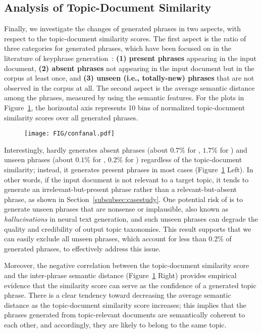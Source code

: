 \subsection{Analysis of Topic-Document Similarity}
\label{subsec:unseenphs}
Finally, we investigate the changes of generated phrases in two aspects, with respect to the topic-document similarity scores.
The first aspect is the ratio of three categories for generated phrases, which have been focused on in the literature of keyphrase generation~\cite{meng2017deep, zhou2021topic}: 
\textbf{(1) present phrases} appearing in the input document, 
\textbf{(2) absent phrases} not appearing in the input document but in the corpus at least once, 
and \textbf{(3) unseen (i.e., totally-new) phrases} that are not observed in the corpus at all.
The second aspect is the average semantic distance among the phrases, measured by using the semantic features. %
For the plots in Figure~\ref{fig:confanal}, the horizontal axis represents 10 bins of normalized topic-document similarity scores over all generated phrases.

\begin{figure}[t]
    \centering
    \texttt{[image: FIG/confanal.pdf]}
    \caption{}
    \label{fig:confanal}
\end{figure}

Interestingly, \proposed hardly generates absent phrases (about $0.7\%$ for \amazon, $1.7\%$ for \dbpedia) and unseen phrases (about $0.1\%$ for \amazon, $0.2\%$ for \dbpedia) regardless of the topic-document similarity; instead, it generates present phrases in most cases (Figure~\ref{fig:confanal} Left). 
In other words, if the input document is not relevant to a target topic, it tends to generate an irrelevant-but-present phrase rather than a relevant-but-absent phrase, as shown in Section~\ref{subsubsec:casestudy}. 
One potential risk of \proposed is to generate unseen phrases that are nonsense or implausible, also known as \textit{hallucinations} in neural text generation, and such unseen phrases can degrade the quality and credibility of output topic taxonomies. 
This result supports that we can easily exclude all unseen phrases, which account for less than 0.2\% of generated phrases, to effectively address this issue.

Moreover, the negative correlation between the topic-document similarity score and the inter-phrase semantic distance (Figure~\ref{fig:confanal} Right) provides empirical evidence that the similarity score can serve as the confidence of a generated topic phrase.
There is a clear tendency toward decreasing the average semantic distance as the topic-document similarity score increases;
this implies that the phrases generated from topic-relevant documents are semantically coherent to each other, and accordingly, they are likely to belong to the same topic.


